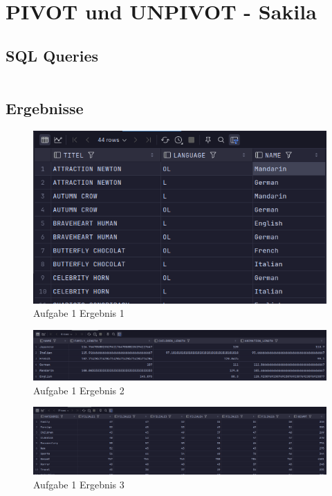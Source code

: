 \documentclass[12pt]{scrartcl}
\begin{document}
\section{PIVOT und UNPIVOT - Sakila}

\subsection{SQL Queries}
\inputminted{sql}{../ue3_1.sql}

\subsection{Ergebnisse}

\begin{figure}[H]
	\centering
	\includegraphics[width=0.7\linewidth]{../ue3_1_1.png}
	\caption{Aufgabe 1 Ergebnis 1}
\end{figure}

\begin{figure}[H]
	\centering
	\includegraphics[width=1\linewidth]{../ue3_1_2.png}
	\caption{Aufgabe 1 Ergebnis 2}
\end{figure}

\begin{figure}[H]
	\centering
	\includegraphics[width=1\linewidth]{../ue3_1_3.png}
	\caption{Aufgabe 1 Ergebnis 3}
\end{figure}
\end{document}
